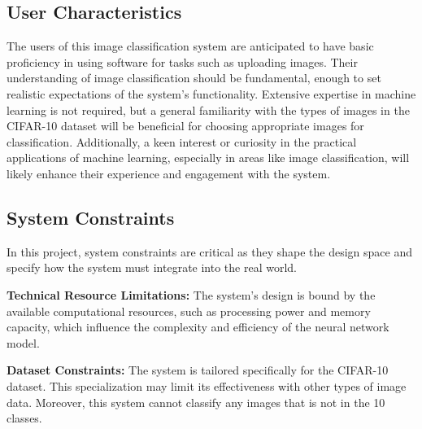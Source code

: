 \documentclass[12pt]{article}
\begin{document}
\subsection{User Characteristics} \label{SecUserCharacteristics}

The users of this image classification system are anticipated to have basic proficiency 
in using software for tasks such as uploading images. Their understanding of image 
classification should be fundamental, enough to set realistic expectations of the system's 
functionality. Extensive expertise in machine learning is not required, but a general familiarity 
with the types of images in the CIFAR-10 dataset will be beneficial for choosing appropriate 
images for classification. Additionally, a keen interest or curiosity in the practical applications 
of machine learning, especially in areas like image classification, will likely enhance their experience 
and engagement with the system.

\subsection{System Constraints}

In this project, system constraints are critical as they shape the design space and specify how 
the system must integrate into the real world.

\begin{inparaitem}
  \textbf{Technical Resource Limitations:} The system's design is bound by the available computational 
  resources, such as processing power and memory capacity, which influence the complexity and 
  efficiency of the neural network model.

  \textbf{Dataset Constraints:} The system is tailored specifically for the CIFAR-10 dataset. 
  This specialization may limit its effectiveness with other types of image data.
  Moreover, this system cannot classify any images that is not in the 10 classes.
\end{inparaitem}
\end{document}
